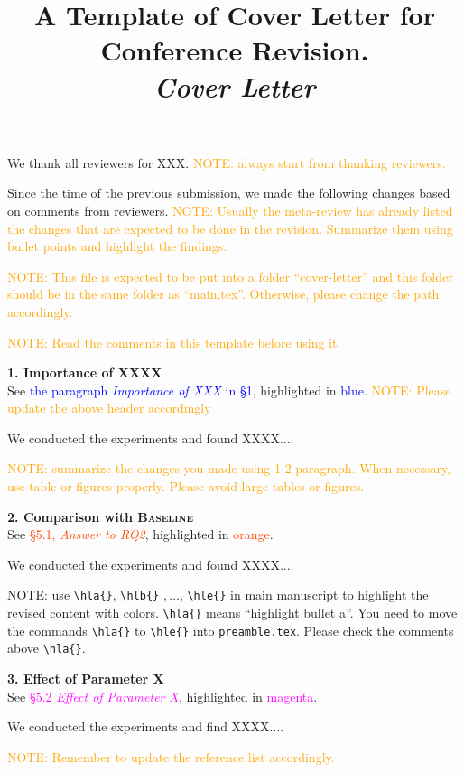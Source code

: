 \documentclass[pageno]{jpaper}
\newcommand\hla[1]{{\textcolor{blue}{#1}}}
\newcommand\hlb[1]{{\textcolor{OrangeRed}{#1}}}
\newcommand\hlc[1]{{\textcolor{magenta}{#1}}}
\newcommand\hle[1]{{\textcolor{purple}{#1}}}
\newcommand\hl[1]{{\textcolor{orange}{#1}}}
\begin{document}
\title{ A Template of Cover Letter for Conference Revision.
\\ \textit{Cover Letter}}



\date{}
\maketitle

\thispagestyle{empty}

\newcommand{\mysection}[1]{\S{#1}\xspace}

\newcommand{\requirement}[2]{\vspace*{5pt}\noindent\textbf{#1}\\{\footnotesize See #2}}


We thank all reviewers for XXX.
\hl{NOTE: always start from thanking reviewers.}

Since the time of the previous submission,
we made the following changes based on comments from reviewers.
\hl{NOTE: Usually the meta-review has already listed the changes that are expected to be done in the revision.
Summarize them using bullet points and highlight the findings.}

 \hl{NOTE: This file is expected to be put into a folder ``cover-letter''
 and this folder should be in the same folder as ``main.tex''.
 Otherwise, please change the path accordingly.}

\hl{NOTE: Read the comments in this template before using it.}



\requirement{1. Importance of XXXX}{
    \hla{the paragraph \textit{Importance of XXX} in \mysection{1}}, highlighted in \hla{blue}.
}
\hl{NOTE: Please update the above header accordingly}

We conducted the experiments and found XXXX....

\hl{NOTE: summarize the changes you made using 1-2 paragraph.
When necessary, use table or figures properly.
Please avoid large tables or figures. }


\requirement{2. Comparison with \textsc{Baseline}}{
    \hlb{\mysection{5.1}, \textit{Answer to RQ2}}, highlighted in \hlb{orange}.
}

We conducted the experiments and found XXXX....

NOTE: use \verb!\hla{}!, \verb!\hlb{}! $,\dots$, \verb!\hle{}!
in main manuscript to highlight the revised content with colors.
\verb!\hla{}! means ``highlight bullet a''.
You need to move the commands \verb!\hla{}! to \verb!\hle{}!
into \texttt{preamble.tex}.
Please check the comments above \verb!\hla{}!.



\requirement{3. Effect of Parameter X}
{\hlc{\mysection{5.2} \textit{Effect of Parameter X}}, highlighted in \hlc{magenta}.}

We conducted the experiments and find XXXX....

\hl{NOTE: Remember to update the reference list accordingly.
}





\end{document}
